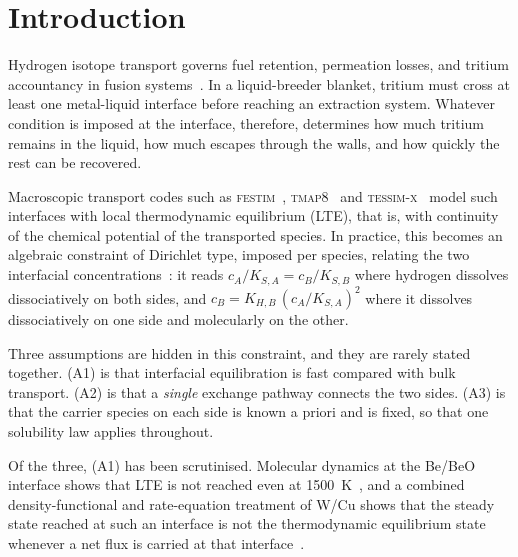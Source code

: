 \documentclass[5p]{elsarticle}
\newcommand{\FESTIM}{\textsc{festim}}
\newcommand{\TMAP}{\textsc{tmap}}
\begin{document}
\section{Introduction}
\label{sec:intro}

Hydrogen isotope transport governs fuel retention, permeation losses, and tritium accountancy in fusion systems~\cite{meschini_impact_2025, meschini_modeling_2023}.
In a liquid-breeder blanket, tritium must cross at least one metal-liquid interface before reaching an extraction system.
Whatever condition is imposed at the interface, therefore, determines how much tritium remains in the liquid, how much escapes through the walls, and how quickly the rest can be recovered.

Macroscopic transport codes such as \FESTIM{}~\cite{dark_festim_2026}, \TMAP{}8~\cite{simon_moose-based_2025} and \textsc{tessim-x}~\cite{schmid_implications_2024} model such interfaces with local thermodynamic equilibrium (LTE), that is, with continuity of the chemical potential of the transported species.
In practice, this becomes an algebraic constraint of Dirichlet type, imposed per species, relating the two interfacial concentrations~\cite{hodille_tritium_2026, shimada_toward_2024, ferrero_preliminary_2022, dark_influence_2021, arredondo_preliminary_2021, delaporte-mathurin_influence_2021, ogorodnikova_model_2002}: it reads $c_A/K_{S,A} = c_B/K_{S,B}$ where hydrogen dissolves dissociatively on both sides, and $c_B = K_{H,B}\,(c_A/K_{S,A})^2$ where it dissolves dissociatively on one side and molecularly on the other.

Three assumptions are hidden in this constraint, and they are rarely stated together.
(A1) is that interfacial equilibration is fast compared with bulk transport.
(A2) is that a \emph{single} exchange pathway connects the two sides.
(A3) is that the carrier species on each side is known a priori and is fixed, so that one solubility law applies throughout.

Of the three, (A1) has been scrutinised.
Molecular dynamics at the Be/BeO interface shows that LTE is not reached even at \qty{1500}{\kelvin}~\cite{hodille_molecular_2022}, and a combined density-functional and rate-equation treatment of W/Cu shows that the steady state reached at such an interface is not the thermodynamic equilibrium state whenever a net flux is carried at that interface~\cite{silva-solis_hydrogen_2026}.
\end{document}
